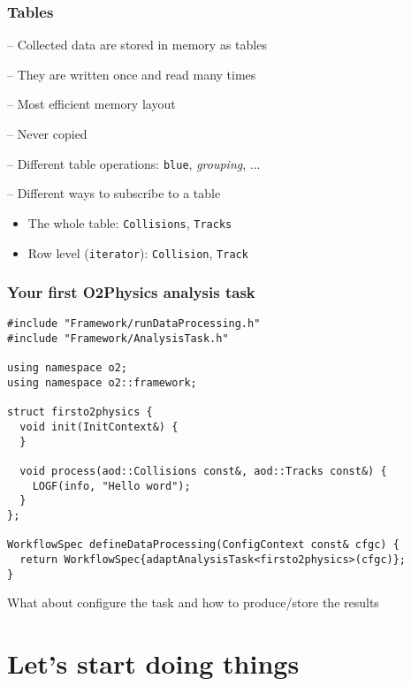 \documentclass[14pt,aspectratio=169,t]{beamer}
\begin{document}
\begin{frame}[fragile]
  \frametitle{Tables}
  -- {\color{blue} Collected data are stored in memory as tables}\par
  -- {\color{blue} They are written once and read many times}\par
  -- {\color{blue} Most efficient memory layout}\par
  -- {\color{blue} Never copied}\par
  \vspace{0.2in}
  -- {\color{blue} Different table operations: \verb!blue!, \textit{grouping}, ...}\par
  -- {\color{blue} Different ways to subscribe to a table}
  \begin{itemize}
    \item The whole table: {\color{blue}\verb|Collisions|}, {\color{blue}\verb|Tracks|}
    \item Row level ({\color{blue}\verb|iterator|}): {\color{blue}\verb|Collision|}, {\color{blue}\verb|Track|}
  \end{itemize}  
\end{frame}


\begin{frame}[fragile]
  \frametitle{Your first O2Physics analysis task}
  \vspace{-0.2in}
  {\scriptsize \color{blue}
  \begin{verbatim}
#include "Framework/runDataProcessing.h"
#include "Framework/AnalysisTask.h"

using namespace o2;
using namespace o2::framework;

struct firsto2physics {
  void init(InitContext&) {
  }

  void process(aod::Collisions const&, aod::Tracks const&) {
    LOGF(info, "Hello word");
  }
};

WorkflowSpec defineDataProcessing(ConfigContext const& cfgc) {
  return WorkflowSpec{adaptAnalysisTask<firsto2physics>(cfgc)};
}
  \end{verbatim}
  }
  \vspace{-0.3in}
  What about configure the task and how to produce/store the results
\end{frame}

\section{Let's start doing things}
\end{document}
